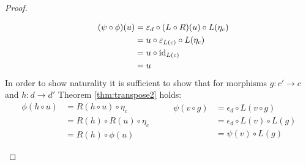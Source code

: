 \begin{theorem}
\begin{proof}
\begin{description}
\[        \quad
        \begin{aligned}
          (\psi\circ \phi)(u)
          &= \varepsilon_d \circ (L\circ R)(u) \circ L(\eta_c)\\
          &= u \circ \varepsilon_{L(c)} \circ L(\eta_c)\\
          &= u \circ \mathrm{id}_{L(c)}\\
          &= u
        \end{aligned}
        \]
        In order to show naturality it is sufficient to show that for morphisms
        $g:c'\to c$ and $h:d\to d'$ Theorem \ref{thm:transpose2} holds:
        \[
          \begin{aligned}
            \phi(h\circ u)
              &= R(h\circ u) \circ \eta_c\\
              &= R(h) \circ R(u) \circ \eta_c\\
              &= R(h) \circ \phi(u)
          \end{aligned}
          \qquad
          \begin{aligned}
            \psi(v\circ g)
              &= \epsilon_d \circ L(v\circ g)\\
              &= \epsilon_d \circ L(v) \circ L(g)\\
              &= \psi(v) \circ L(g)
          \end{aligned}
        \]
    \end{description}
  \end{proof}
\end{theorem}